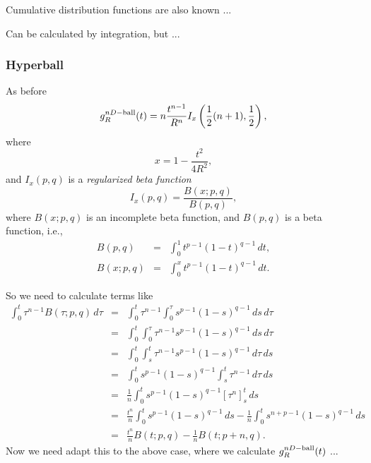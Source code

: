 \documentclass{article}
\begin{document}
Cumulative distribution functions are also known ...

Can be calculated by integration, but ...


\subsubsection{Hyperball}

As before
\begin{equation}
 g^{nD-{\rm ball}}_R(t) = n \frac{t^{n-1}}{R^n} I_x\left( 
  \frac{1}{2} (n+1), \frac{1}{2}
                      \right),
\end{equation}
where
\begin{equation}
 x = 1 - \frac{t^2}{4 R^2}, 
\end{equation}
and $I_x(p,q)$ is a {\em regularized beta function}
\begin{equation}
   I_x(p,q) = \frac{ B(x; p,q)}{B(p,q)},
\end{equation}
where $B(x; p,q)$ is an incomplete beta function, and $B(p,q)$ is a
beta function, i.e., 
\begin{eqnarray}
  B(p,q)    & = & \int_0^1 t^{p-1} (1 - t)^{q-1} \, dt, \\
  B(x; p,q) & = & \int_0^x t^{p-1} (1 - t)^{q-1} \, dt.
\end{eqnarray}

So we need to calculate terms like
\begin{eqnarray}
  \label{eq:int_incomp_beta}
  \int_0^t \tau^{n-1}  B(\tau; p,q) \, d\tau
       & = & \int_0^t \tau^{n-1}  \int_0^\tau s^{p-1} (1 - s)^{q-1} \, ds \, d\tau \nonumber \\
       & = & \int_0^t \int_0^\tau \tau^{n-1}  s^{p-1} (1 - s)^{q-1} \, ds \, d\tau \nonumber \\
       & = & \int_0^t \int_s^t \tau^{n-1}  s^{p-1} (1 - s)^{q-1} \, d\tau  \, ds \nonumber \\
       & = & \int_0^t  s^{p-1} (1 - s)^{q-1} \int_s^t \tau^{n-1} \, d\tau  \, ds \nonumber \\
       & = & \frac{1}{n} \int_0^t  s^{p-1} (1 - s)^{q-1} \left[ \tau^{n} \right]_s^t  \, ds \nonumber \\
       & = & \frac{t^n}{n} \int_0^t  s^{p-1} (1 - s)^{q-1} \, ds -
             \frac{1}{n} \int_0^t  s^{n+p-1} (1 - s)^{q-1} \, ds \nonumber \\
       & = & \frac{t^n}{n} B(t; p,q) - \frac{1}{n} B(t; p+n,q).
\end{eqnarray}
Now we need adapt this to the above case, where we calculate
$g^{nD-{\rm ball}}_R(t)$ ...
\end{document}
